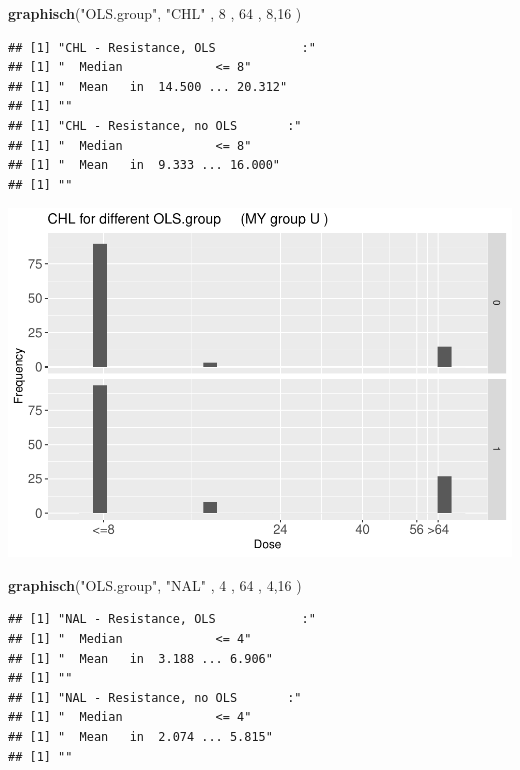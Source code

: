 \documentclass[
]{article}
\newenvironment{Shaded}{\begin{snugshade}}{\end{snugshade}}
\newcommand{\DecValTok}[1]{\textcolor[rgb]{0.00,0.00,0.81}{#1}}
\newcommand{\KeywordTok}[1]{\textcolor[rgb]{0.13,0.29,0.53}{\textbf{#1}}}
\newcommand{\NormalTok}[1]{#1}
\newcommand{\StringTok}[1]{\textcolor[rgb]{0.31,0.60,0.02}{#1}}
\begin{document}
\begin{Shaded}
\begin{Highlighting}[]
  \KeywordTok{graphisch}\NormalTok{(}\StringTok{"OLS.group"}\NormalTok{, }\StringTok{"CHL"}\NormalTok{ , }\DecValTok{8}\NormalTok{    ,  }\DecValTok{64}\NormalTok{   ,   }\DecValTok{8}\NormalTok{,}\DecValTok{16}\NormalTok{    ) }
\end{Highlighting}
\end{Shaded}

\begin{verbatim}
## [1] "CHL - Resistance, OLS            :"
## [1] "  Median             <= 8"
## [1] "  Mean   in  14.500 ... 20.312"
## [1] ""
## [1] "CHL - Resistance, no OLS       :"
## [1] "  Median             <= 8"
## [1] "  Mean   in  9.333 ... 16.000"
## [1] ""
\end{verbatim}

\includegraphics{Verteilungen_files/figure-latex/unnamed-chunk-26-1.pdf}

\begin{Shaded}
\begin{Highlighting}[]
  \KeywordTok{graphisch}\NormalTok{(}\StringTok{"OLS.group"}\NormalTok{, }\StringTok{"NAL"}\NormalTok{ , }\DecValTok{4}\NormalTok{    ,  }\DecValTok{64}\NormalTok{   ,   }\DecValTok{4}\NormalTok{,}\DecValTok{16}\NormalTok{    ) }
\end{Highlighting}
\end{Shaded}

\begin{verbatim}
## [1] "NAL - Resistance, OLS            :"
## [1] "  Median             <= 4"
## [1] "  Mean   in  3.188 ... 6.906"
## [1] ""
## [1] "NAL - Resistance, no OLS       :"
## [1] "  Median             <= 4"
## [1] "  Mean   in  2.074 ... 5.815"
## [1] ""
\end{verbatim}
\end{document}
